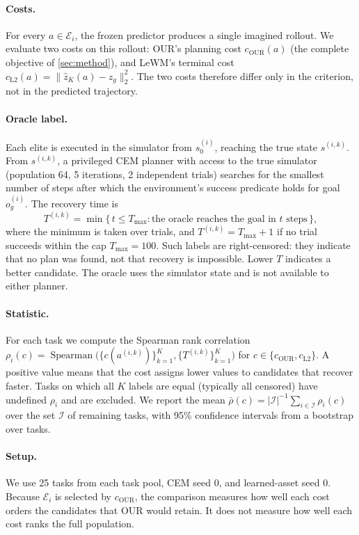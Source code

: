 \documentclass{article} %
\theoremstyle{definition}
\theoremstyle{remark}
\begin{document}
\paragraph{Costs.} For every $a \in \mathcal{E}_i$, the frozen predictor produces a single
imagined rollout. We evaluate two costs on this rollout: OUR's planning cost
$c_{\mathrm{OUR}}(a)$ (the complete objective of \cref{sec:method}), and LeWM's terminal cost
$c_{\mathrm{L2}}(a) = \lVert \hat z_K(a) - z_g \rVert_2^2$. The two costs therefore differ
only in the criterion, not in the predicted trajectory.

\paragraph{Oracle label.} Each elite is executed in the simulator from $s_0^{(i)}$, reaching
the true state $s^{(i,k)}$. From $s^{(i,k)}$, a privileged CEM planner with access to
the true simulator (population 64, 5 iterations, 2 independent trials) searches for the
smallest number of steps after which the environment's success predicate holds for goal
$o_g^{(i)}$. The recovery time is
\begin{equation}
  T^{(i,k)} = \min\bigl\{\, t \le T_{\max} : \text{the oracle reaches the goal in } t \text{ steps} \,\bigr\},
\end{equation}
where the minimum is taken over trials, and $T^{(i,k)} = T_{\max}+1$ if no trial succeeds
within the cap $T_{\max}=100$. Such labels are right-censored: they indicate that no plan was
found, not that recovery is impossible. Lower $T$ indicates a better candidate. The oracle
uses the simulator state and is not available to either planner.

\paragraph{Statistic.} For each task we compute the Spearman rank correlation
$\rho_i(c) = \operatorname{Spearman}\bigl(\{c(a^{(i,k)})\}_{k=1}^{K}, \{T^{(i,k)}\}_{k=1}^{K}\bigr)$
for $c \in \{c_{\mathrm{OUR}}, c_{\mathrm{L2}}\}$. A positive value means that the cost assigns lower values to
candidates that recover faster. Tasks on which all $K$ labels are equal (typically all
censored) have undefined $\rho_i$ and are excluded. We report the mean
$\bar\rho(c) = |\mathcal{I}|^{-1}\sum_{i\in\mathcal{I}} \rho_i(c)$ over the set $\mathcal{I}$ of
remaining tasks, with 95\% confidence intervals from a bootstrap over tasks.

\paragraph{Setup.} We use 25 tasks from each task pool, CEM seed 0, and learned-asset seed 0. Because $\mathcal{E}_i$ is selected by
$c_{\mathrm{OUR}}$, the comparison measures how well each cost orders the candidates that OUR
would retain. It does not measure how well each cost ranks the full population.
\end{document}
